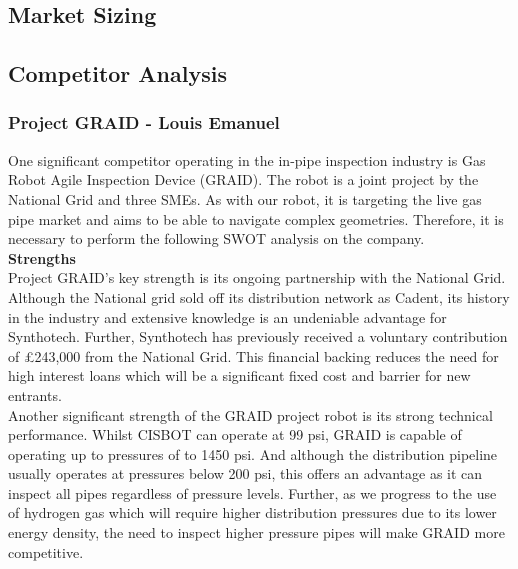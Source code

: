 \documentclass[11pt]{article}		%
\begin{document}
        \subsection{Market Sizing}
        
        \subsection{Competitor Analysis}
		
		\subsubsection[Project GRAID]{Project GRAID - Louis Emanuel}
		
			One significant competitor operating in the in-pipe inspection industry is Gas Robot Agile Inspection Device (GRAID). The robot is a joint project by the National Grid and three SMEs. As with our robot, it is targeting the live gas pipe market and aims to be able to navigate complex geometries. Therefore, it is necessary to perform the following SWOT analysis on the company. \\
			
			\textbf{Strengths} \\
			Project GRAID's key strength is its ongoing partnership with the National Grid. Although the National grid sold off its distribution network as Cadent, its history in the industry and extensive knowledge is an undeniable advantage for Synthotech. Further, Synthotech has previously received a voluntary contribution of £243,000 from the National Grid. This financial backing reduces the need for high interest loans which will be a significant fixed cost and barrier for new entrants. \\
		    \hspace*{3ex}Another significant strength of the GRAID project robot is its strong technical performance. Whilst CISBOT can operate at 99 psi, GRAID is capable of operating up to pressures of to 1450 psi. And although the distribution pipeline usually operates at pressures below 200 psi, this offers an advantage as it can inspect all pipes regardless of pressure levels. Further, as we progress to the use of hydrogen gas which will require higher distribution pressures due to its lower energy density, the need to inspect higher pressure pipes will make GRAID more competitive. 
	        
\end{document}

